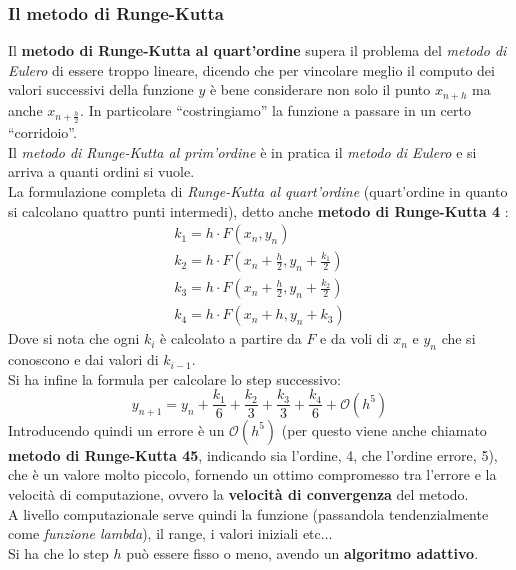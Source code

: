 \documentclass[a4paper,12pt, oneside]{book}
\begin{document}
\subsubsection{Il metodo di Runge-Kutta}
Il \textbf{metodo di Runge-Kutta al quart'ordine} supera il problema del
\textit{metodo di Eulero} di essere troppo lineare, dicendo che per vincolare
meglio il computo dei valori successivi della funzione $y$ è bene considerare
non solo il punto $x_{n+h}$ ma anche $x_{n+\frac{h}{2}}$. In particolare
``costringiamo'' la funzione a passare in un certo ``corridoio''.\\
Il \textit{metodo di Runge-Kutta al prim'ordine} è in pratica il \textit{metodo
  di Eulero} e si arriva a quanti ordini si vuole.\\ 
La formulazione completa di \textit{Runge-Kutta al quart'ordine} (quart'ordine
in quanto si calcolano quattro punti intermedi), detto anche
\textbf{metodo di Runge-Kutta 4} :
\begin{gather*}
  k_1=h\cdot F\left(x_n,y_n\right)\\
  k_2=h\cdot F\left(x_n+\frac{h}{2},y_n+\frac{k_1}{2}\right)\\
  k_3=h\cdot F\left(x_n+\frac{h}{2},y_n+\frac{k_2}{2}\right)\\
  k_4=h\cdot F\left(x_n+h,y_n+k_3\right)
\end{gather*}
Dove si nota che ogni $k_i$ è calcolato a partire da $F$ e da voli di $x_n$ e
$y_n$ che si conoscono e dai valori di $k_{i-1}$.\\
Si ha infine la formula per calcolare lo step successivo:
\[y_{n+1}=y_n+\frac{k_1}{6}+\frac{k_2}{3}+\frac{k_3}{3}+\frac{k_4}{6}+
  \mathcal{O}(h^5)\]
Introducendo quindi un errore è un $\mathcal{O}(h^5)$ (per questo viene anche
chiamato \textbf{metodo di Runge-Kutta 45}, indicando sia l'ordine, 4, che
l'ordine errore, 5), che è un valore molto
piccolo, fornendo un ottimo compromesso tra l'errore e la velocità di
computazione, ovvero la \textbf{velocità di convergenza} del metodo. \\
A livello computazionale serve quindi la funzione (passandola tendenzialmente
come \textit{funzione lambda}), il range, i valori iniziali etc$\ldots$ \\
Si ha che lo step $h$ può essere fisso o meno, avendo un \textbf{algoritmo
  adattivo}. 
\end{document}

